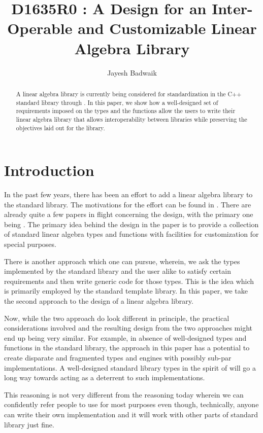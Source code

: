 \documentclass[oneside,11pt,a4paper]{jbarticle}
\subtitle{}
\title{D1635R0 : A Design for an Inter-Operable and Customizable Linear Algebra Library}
\author{Jayesh Badwaik}
\begin{document}
\maketitle[\value{page}]
\begin{abstract}
  A linear algebra library is currently being considered for standardization in
  the C++ standard library through \cite{GuyDavidson2019}.
  In this paper, we show how a well-designed set of requirements imposed on the
  types and the functions allow the users to write their linear algebra library
  that allows interoperability between libraries while preserving the objectives
  laid out for the library.
\end{abstract}

\section{Introduction}

In the past few years, there has been an effort to add a linear algebra library
to the standard library. The motivations for the effort can be found in
\cite{GuyDavidson2019a}. There are already quite a few papers in flight
concerning the design, with the primary one being \cite{GuyDavidson2019}. The
primary idea behind the design in the paper is to provide a collection of
standard linear algebra types and functions with facilities for customization
for special purposes.

There is another approach which one can pursue, wherein, we ask the
types implemented by the standard library and the user alike to satisfy certain
requirements and then write generic code for those types. This is the idea which
is primarily employed by the standard template library.
In this paper, we take the second approach to the design of a linear algebra
library.

Now, while the two approach do look different in principle, the
practical considerations involved and the resulting design from the two
approaches might end up being  very similar.  For example, in absence of
well-designed types and functions in the standard library, the approach in this
paper has a potential to create disparate and fragmented types and engines with
possibly sub-par implementations.  A well-designed standard library types in the
spirit of \cite{GuyDavidson2019} will go a long way towards acting as a
deterrent to such implementations.

This reasoning is not very different from the reasoning today wherein we can
confidently refer people to use  for most purposes even
though, technically, anyone can write their own 
implementation and it will work with other parts of standard library just fine.
\end{document}
